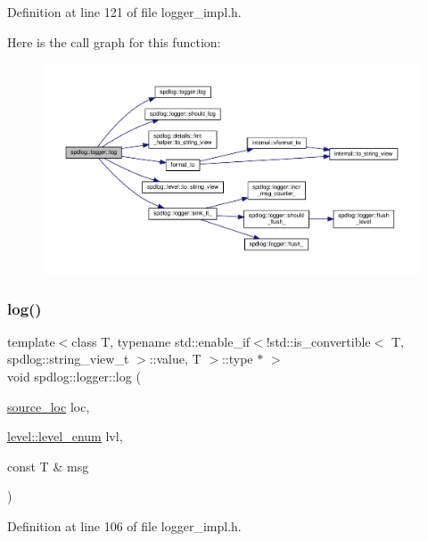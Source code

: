 Definition at line 121 of file logger\+\_\+impl.\+h.

Here is the call graph for this function\+:
\nopagebreak
\begin{figure}[H]
\begin{center}
\leavevmode
\includegraphics[width=350pt]{classspdlog_1_1logger_a706ca9501457bdda5562cf0dffeca712_cgraph}
\end{center}
\end{figure}
\mbox{\label{classspdlog_1_1logger_a4ad269959d007dcbe38cdb3c4e70d85b}} 
\subsubsection{\texorpdfstring{log()}{log()}\hspace{0.1cm}{\footnotesize\ttfamily [6/8]}}
{\footnotesize\ttfamily template$<$class T, typename std\+::enable\+\_\+if$<$!std\+::is\+\_\+convertible$<$ T, spdlog\+::string\+\_\+view\+\_\+t $>$\+::value, T $>$\+::type $\ast$ $>$ \\
void spdlog\+::logger\+::log (\begin{DoxyParamCaption}\item[{\hyperlink{structspdlog_1_1source__loc}{source\+\_\+loc}}]{loc,  }\item[{\hyperlink{namespacespdlog_1_1level_a35f5227e5daf228d28a207b7b2aefc8b}{level\+::level\+\_\+enum}}]{lvl,  }\item[{const T \&}]{msg }\end{DoxyParamCaption})\hspace{0.3cm}{\ttfamily [inline]}}



Definition at line 106 of file logger\+\_\+impl.\+h.

